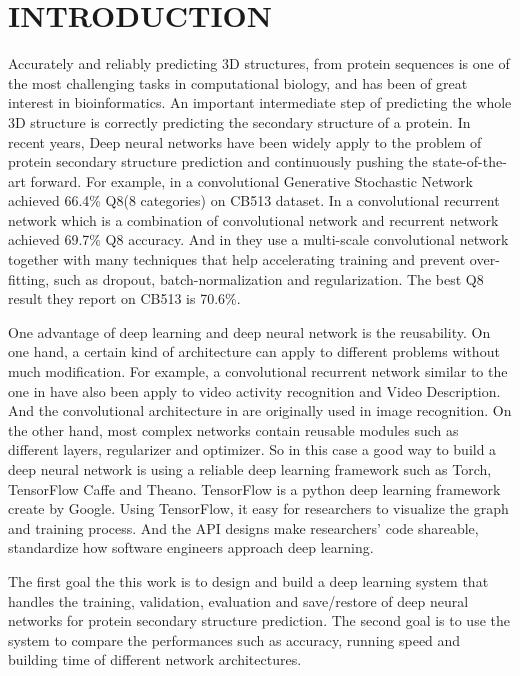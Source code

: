 \chapter{INTRODUCTION}
	\label{CH_Intro}

Accurately and reliably predicting 3D structures, from protein sequences 
is one of the most challenging tasks in computational biology, and has been of great
interest in bioinformatics. An important intermediate step of predicting the whole 3D structure 
is correctly predicting the secondary structure of a protein\cite{yaseen2014context}. In recent years, 
Deep neural networks have been widely apply to the problem of protein secondary structure prediction and continuously pushing the state-of-the-art forward. For example, in\cite{zhou2014deep} a convolutional Generative Stochastic Network achieved 66.4\% Q8(8 categories) on CB513 dataset.  In \cite{Z.Li2016} a convolutional recurrent network which is a combination of convolutional network and recurrent network achieved 69.7\% Q8 accuracy. And in \cite{busia2016protein} they use a multi-scale convolutional network together with many techniques that help accelerating training and prevent over-fitting, such as dropout\cite{srivastava2014dropout}, batch-normalization\cite{ioffe2015batch} and regularization. The best Q8 result they report on CB513 is 70.6\%. 

One advantage of deep learning and deep neural network is the reusability. On one hand, a certain kind of architecture can apply to different problems without much modification. For example, a convolutional recurrent network similar to the one in \cite{Z.Li2016} have also been apply to video activity recognition and Video Description\cite{donahue2015long}. And the convolutional architecture in\cite{busia2016protein} are originally used in image recognition. On the other hand, most complex networks contain reusable modules such as different layers, regularizer and optimizer. So in this case a good way to build a deep neural network is using a reliable deep learning framework such as Torch, TensorFlow Caffe and Theano. TensorFlow\cite{abadi2016tensorflow} is a python deep learning framework create by Google. Using TensorFlow, it easy for researchers to visualize the graph and training process. And the API designs make researchers’ code shareable, standardize how software engineers approach deep learning.

The first goal the this work is to design and build a deep learning system that handles the training, validation, evaluation and save/restore of deep neural networks for protein secondary structure prediction. The second goal is to use the system to compare the performances such as accuracy, running speed and building time of different network architectures.

